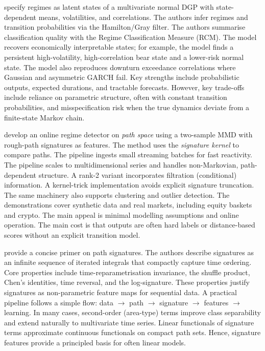 \cite{10.1093/rfs/15.4.1137} specify regimes as latent states of a multivariate normal DGP with state-dependent means, volatilities, and correlations. The authors infer regimes and transition probabilities via the Hamilton/Gray filter. The authors summarise classification quality with the Regime Classification Measure (RCM). The model recovers economically interpretable states; for example, the model finds a persistent high-volatility, high-correlation bear state and a lower-risk normal state. The model also reproduces downturn exceedance correlations where Gaussian and asymmetric GARCH fail. Key strengths include probabilistic outputs, expected durations, and tractable forecasts. However, key trade-offs include reliance on parametric structure, often with constant transition probabilities, and misspecification risk when the true dynamics deviate from a finite-state Markov chain.

\cite{issa2023nonparametriconlinemarketregime} develop an online regime detector on \emph{path space} using a two-sample MMD with rough-path signatures as features. The method uses the \emph{signature kernel} to compare paths. The pipeline ingests small streaming batches for fast reactivity. The pipeline scales to multidimensional series and handles non-Markovian, path-dependent structure. A rank-2 variant incorporates filtration (conditional) information. A kernel-trick implementation avoids explicit signature truncation. The same machinery also supports clustering and outlier detection. The demonstrations cover synthetic data and real markets, including equity baskets and crypto. The main appeal is minimal modelling assumptions and online operation. The main cost is that outputs are often hard labels or distance-based scores without an explicit transition model.

\cite{chevyrev2025primersignaturemethodmachine} provide a concise primer on path signatures. The authors describe signatures as an infinite sequence of iterated integrals that compactly capture time ordering. Core properties include time-reparametrisation invariance, the shuffle product, Chen's identities, time reversal, and the log-signature. These properties justify signatures as non-parametric feature maps for sequential data. A practical pipeline follows a simple flow: data $\rightarrow$ path $\rightarrow$ signature $\rightarrow$ features $\rightarrow$ learning. In many cases, second-order (area-type) terms improve class separability and extend naturally to multivariate time series. Linear functionals of signature terms approximate continuous functionals on compact path sets. Hence, signature features provide a principled basis for often linear models.


